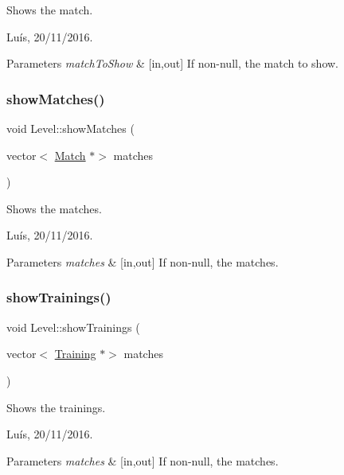 Shows the match. 

Luís, 20/11/2016. 


\begin{DoxyParams}{Parameters}
{\em match\+To\+Show} & \mbox{[}in,out\mbox{]} If non-\/null, the match to show. \\
\hline
\end{DoxyParams}
\hypertarget{class_level_ab28a5bc03ae76bb52b44711c4d59e56f}{}\label{class_level_ab28a5bc03ae76bb52b44711c4d59e56f} 
\subsubsection{\texorpdfstring{show\+Matches()}{showMatches()}}
{\footnotesize\ttfamily void Level\+::show\+Matches (\begin{DoxyParamCaption}\item[{vector$<$ \hyperlink{class_match}{Match} $\ast$$>$}]{matches }\end{DoxyParamCaption})}



Shows the matches. 

Luís, 20/11/2016. 


\begin{DoxyParams}{Parameters}
{\em matches} & \mbox{[}in,out\mbox{]} If non-\/null, the matches. \\
\hline
\end{DoxyParams}
\hypertarget{class_level_a213282facf5cf571e5266013124d0002}{}\label{class_level_a213282facf5cf571e5266013124d0002} 
\subsubsection{\texorpdfstring{show\+Trainings()}{showTrainings()}}
{\footnotesize\ttfamily void Level\+::show\+Trainings (\begin{DoxyParamCaption}\item[{vector$<$ \hyperlink{class_training}{Training} $\ast$$>$}]{matches }\end{DoxyParamCaption})}



Shows the trainings. 

Luís, 20/11/2016. 


\begin{DoxyParams}{Parameters}
{\em matches} & \mbox{[}in,out\mbox{]} If non-\/null, the matches. \\
\hline
\end{DoxyParams}
\hypertarget{class_level_a26d032066034ca77792322903d0edfd5}{}\label{class_level_a26d032066034ca77792322903d0edfd5} 
